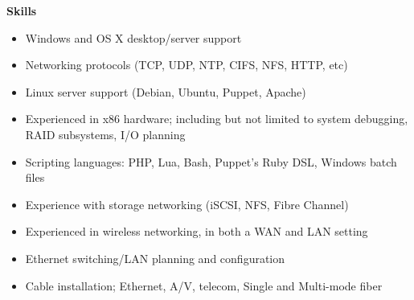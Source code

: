 \documentclass{article}
\newcommand{\skills}[1]{
\heading{Skills}
\makebox[0.25in][l]{}
\begin{minipage}[t]{7.00in}\small{#1}\end{minipage}
\\
}
\newcommand{\heading}[1]{
\noindent\textbf{#1}
\\
}
\begin{document}
\skills{
    \begin{itemize}\itemsep0em\footnotesize
        \item Windows and OS X desktop/server support
        \item Networking protocols (TCP, UDP, NTP, CIFS, NFS, HTTP, etc)
        \item Linux server support (Debian, Ubuntu, Puppet, Apache)
        \item Experienced in x86 hardware; including but not limited to system debugging,
        RAID subsystems, I/O planning
        \item Scripting languages: PHP, Lua, Bash, Puppet's Ruby DSL, Windows batch files
        \item Experience with storage networking (iSCSI, NFS, Fibre Channel)
        \item Experienced in wireless networking, in both a WAN and LAN setting
        \item Ethernet switching/LAN planning and configuration
        \item Cable installation; Ethernet, A/V, telecom, Single and Multi-mode fiber
    \end{itemize}
}
\end{document}
